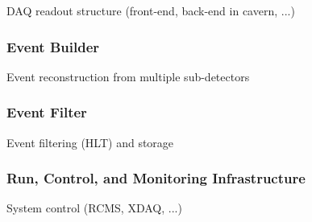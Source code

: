                 DAQ readout structure (front-end, back-end in cavern, ...)

            \subsubsection{Event Builder}

                Event reconstruction from multiple sub-detectors

            \subsubsection{Event Filter}

                Event filtering (HLT) and storage

            \subsubsection{Run, Control, and Monitoring Infrastructure}

                System control (RCMS, XDAQ, ...)

